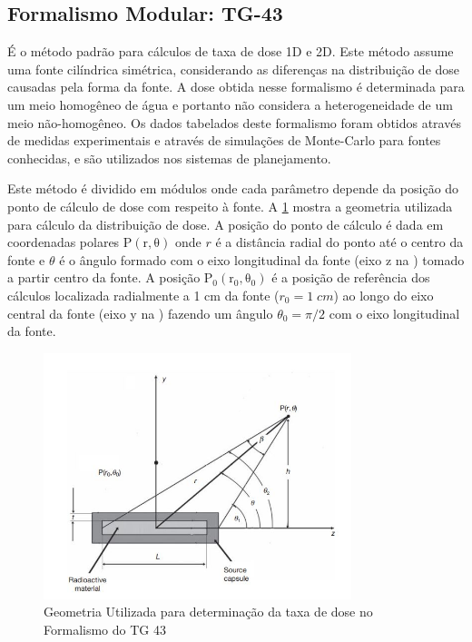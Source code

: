 \documentclass[11pt,a4paper]{article}
\begin{document}
		\subsection{Formalismo Modular: TG-43}

			É o método padrão para cálculos de taxa de dose 1D e 2D. Este método assume uma fonte cilíndrica simétrica, considerando as diferenças na distribuição de dose causadas pela forma da fonte. A dose obtida nesse formalismo é determinada para um meio homogêneo de água e portanto não considera a heterogeneidade de um meio não-homogêneo. Os dados tabelados deste formalismo foram obtidos através de medidas experimentais e através de simulações de Monte-Carlo para fontes conhecidas, e são utilizados nos sistemas de planejamento.

			Este método é dividido em módulos onde cada parâmetro depende da posição do ponto de cálculo de dose com respeito à fonte. A    \ref{img:FormalismoTg43} mostra a geometria utilizada para cálculo da distribuição de dose. A posição do ponto de cálculo é dada em coordenadas polares $\mathrm{P(r, \theta)}$ onde $r$ é a distância radial do ponto até o centro da fonte e $\theta$ é o ângulo formado com o eixo longitudinal da fonte (eixo z na   ) tomado a partir centro da fonte. A posição $\mathrm{P_0(r_0, \theta_0)}$ é a posição de referência dos cálculos localizada radialmente a 1 cm da fonte ($r_0 = 1 \; cm$) ao longo do eixo central da fonte (eixo y na   ) fazendo um ângulo $\theta_0 = \pi / 2$ com o eixo longitudinal da fonte.


				\begin{figure}[h]
					\centering
					\includegraphics[width=0.8\textwidth]{Imagens/esquemaFormalismoTg43.JPG}
					\caption{Geometria Utilizada para determinação da taxa de dose no Formalismo do TG 43}
					\label{img:FormalismoTg43}
				\end{figure}
\end{document}
